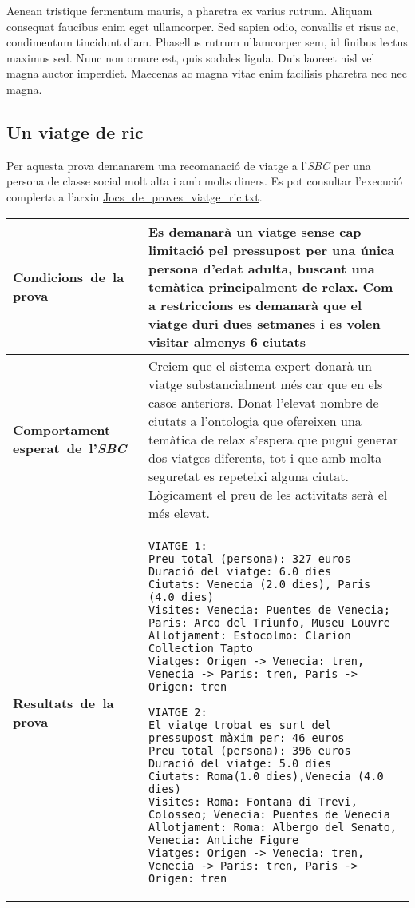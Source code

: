 \documentclass[11pt,a4paper]{article}
\begin{document}
Aenean tristique fermentum mauris, a pharetra ex varius rutrum. Aliquam consequat faucibus enim eget ullamcorper. Sed sapien odio, convallis et risus ac, condimentum tincidunt diam. Phasellus rutrum ullamcorper sem, id finibus lectus maximus sed. Nunc non ornare est, quis sodales ligula. Duis laoreet nisl vel magna auctor imperdiet. Maecenas ac magna vitae enim facilisis pharetra nec nec magna.

\subsection{Un viatge de ric}
Per aquesta prova demanarem una recomanació de viatge a l'\emph{SBC} per una persona de classe social molt alta i amb molts diners. Es pot consultar l'execució complerta a l'arxiu \url{Jocs_de_proves_viatge_ric.txt}. \\

\noindent
\begin{tabular}{|p{}|p{}|}

\hline
\textbf{\mbox{Condicions de la} \mbox{prova}} & Es demanarà un viatge sense cap limitació pel pressupost per una única persona d'edat adulta, buscant una temàtica principalment de relax. Com a restriccions es demanarà que el viatge duri dues setmanes i es volen visitar almenys 6 ciutats\\
\hline
\textbf{Comportament \mbox{esperat de l'\emph{SBC}}} & Creiem que el sistema expert donarà un viatge substancialment més car que en els casos anteriors. Donat l'elevat nombre de ciutats a l'ontologia que ofereixen una temàtica de relax s'espera que pugui generar dos viatges diferents, tot i que amb molta seguretat es repeteixi alguna ciutat. Lògicament el preu de les activitats serà el més elevat.\\
\hline
\textbf{\mbox{Resultats de la} \mbox{prova}} & 
\begin{verbatim}VIATGE 1:
Preu total (persona): 327 euros
Duració del viatge: 6.0 dies
Ciutats: Venecia (2.0 dies), Paris (4.0 dies)
Visites: Venecia: Puentes de Venecia; Paris: Arco del Triunfo, Museu Louvre
Allotjament: Estocolmo: Clarion Collection Tapto
Viatges: Origen -> Venecia: tren, Venecia -> Paris: tren, Paris -> Origen: tren

VIATGE 2:
El viatge trobat es surt del pressupost màxim per: 46 euros
Preu total (persona): 396 euros
Duració del viatge: 5.0 dies
Ciutats: Roma(1.0 dies),Venecia (4.0 dies)
Visites: Roma: Fontana di Trevi, Colosseo; Venecia: Puentes de Venecia
Allotjament: Roma: Albergo del Senato, Venecia: Antiche Figure
Viatges: Origen -> Venecia: tren, Venecia -> Paris: tren, Paris -> Origen: tren

\end{verbatim} \\
\hline
\end{tabular}
\medskip
\end{document}
